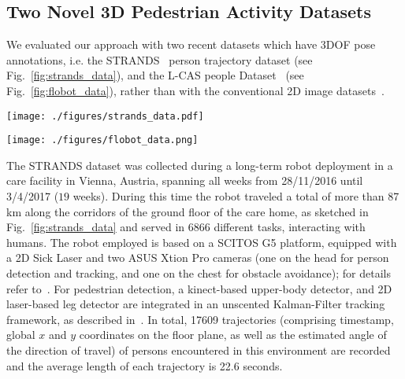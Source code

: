 \documentclass[letterpaper, 10 pt, conference]{ieeeconf}  %
\begin{document}
\subsection{Two Novel 3D Pedestrian Activity Datasets}\label{sec:datasets}

We evaluated our approach with two recent datasets which have 3DOF pose annotations, i.e. the STRANDS~\cite{Hawes2016} person trajectory dataset (see Fig.~\ref{fig:strands_data}), and the L-CAS people Dataset~\cite{yz17iros} (see Fig.~\ref{fig:flobot_data}), rather than with the conventional 2D image datasets~\cite{UCY,ETH,SDD}.

\begin{figure*}[t]
\centering
\texttt{[image: ./figures/strands\_data.pdf]}
\caption{Part of the trajectory examples in the STRANDS dataset are shown. The three sub-figures are zoomed in iteratively.}
\label{fig:strands_data}
\end{figure*}

\begin{figure*}[t]
\centering
\texttt{[image: ./figures/flobot\_data.png]}
\caption{Trajectory examples in the L-CAS dataset including: extracted pedestrian trajectories (left), detected point clusters (middle), and trajectories heatmap (right). In the heatmap, warmer colors indicate higher frequencies of pedestrian occupancy. The map is normalized between 0 and 1.}
\label{fig:flobot_data}
\end{figure*}

The STRANDS dataset was collected during a long-term robot deployment in a care facility in Vienna, Austria, spanning all weeks from 28/11/2016 until 3/4/2017 ($19$ weeks). During this time the robot traveled a total of more than 87 km along the corridors of the ground floor of the care home, as sketched in Fig.~\ref{fig:strands_data} and served in 6866 different tasks, interacting with humans. 
The robot employed is based on a SCITOS G5 platform, equipped with a 2D Sick Laser and two ASUS Xtion Pro cameras (one on the head for person detection and tracking, and one on the chest for obstacle avoidance); for details refer to~\cite{Hawes2016}.  For pedestrian detection, a kinect-based upper-body detector, and 2D laser-based leg detector  are integrated in an unscented Kalman-Filter tracking framework, as described in~\cite{Dondrup2015a}. In total, 17609 trajectories (comprising timestamp, global $x$ and $y$ coordinates on the floor plane, as well as the estimated angle of the direction of travel) of persons encountered in this environment are recorded and the average length of each trajectory is 22.6 seconds.
\end{document}
